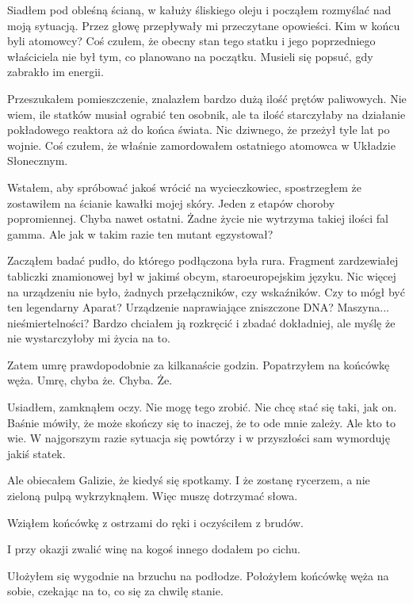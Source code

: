 Siadłem pod obleśną ścianą, w kałuży śliskiego oleju i począłem rozmyślać nad moją sytuacją.
Przez głowę przepływały mi przeczytane opowieści.
Kim w końcu byli atomowcy? Coś czułem, że obecny stan tego statku i jego poprzedniego właściciela nie był tym, co planowano na początku.
Musieli się popsuć, gdy zabrakło im energii.

Przeszukałem pomieszczenie, znalazłem bardzo dużą ilość prętów paliwowych.
Nie wiem, ile statków musiał ograbić ten osobnik, ale ta ilość starczyłaby na działanie pokładowego reaktora aż do końca świata.
Nic dziwnego, że przeżył tyle lat po wojnie.
Coś czułem, że właśnie zamordowałem ostatniego atomowca w Układzie Słonecznym.

Wstałem, aby spróbować jakoś wrócić na wycieczkowiec, spostrzegłem że zostawiłem na ścianie kawałki mojej skóry.
Jeden z etapów choroby popromiennej. Chyba nawet ostatni.
Żadne życie nie wytrzyma takiej ilości fal gamma.
Ale jak w takim razie ten mutant egzystował?

Zacząłem badać pudło, do którego podłączona była rura.
Fragment zardzewiałej tabliczki znamionowej był w jakimś obcym, staroeuropejskim języku.
Nic więcej na urządzeniu nie było, żadnych przełączników, czy wskaźników.
Czy to mógł być ten legendarny Aparat?
Urządzenie naprawiające zniszczone DNA? Maszyna... nieśmiertelności?
Bardzo chciałem ją rozkręcić i zbadać dokładniej, ale myślę że nie wystarczyłoby mi życia na to.

Zatem umrę prawdopodobnie za kilkanaście godzin.
Popatrzyłem na końcówkę węża.
Umrę, chyba że.
Chyba. Że.

Usiadłem, zamknąłem oczy.
Nie mogę tego zrobić.
Nie chcę stać się taki, jak on.
Baśnie mówiły, że może skończy się to inaczej, że to ode mnie zależy.
Ale kto to wie.
W najgorszym razie sytuacja się powtórzy i w przyszłości sam wymorduję jakiś statek.

\begin{dialogue}
	\ds{} Ale obiecałem Galizie, że kiedyś się spotkamy. I że zostanę rycerzem, a nie zieloną pulpą \dm{} wykrzyknąłem. \dm{} Więc muszę dotrzymać słowa.
\end{dialogue}
Wziąłem końcówkę z ostrzami do ręki i oczyściłem z brudów.
\begin{dialogue}
	\ds{} I przy okazji zwalić winę na kogoś innego \dm{} dodałem po cichu.
\end{dialogue}

Ułożyłem się wygodnie na brzuchu na podłodze.
Położyłem końcówkę węża na sobie, czekając na to, co się za chwilę stanie.

